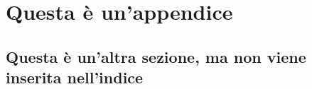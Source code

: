 \chapter{Questa è un'appendice}


\section*{Questa è un'altra sezione, ma non viene inserita nell'indice}

